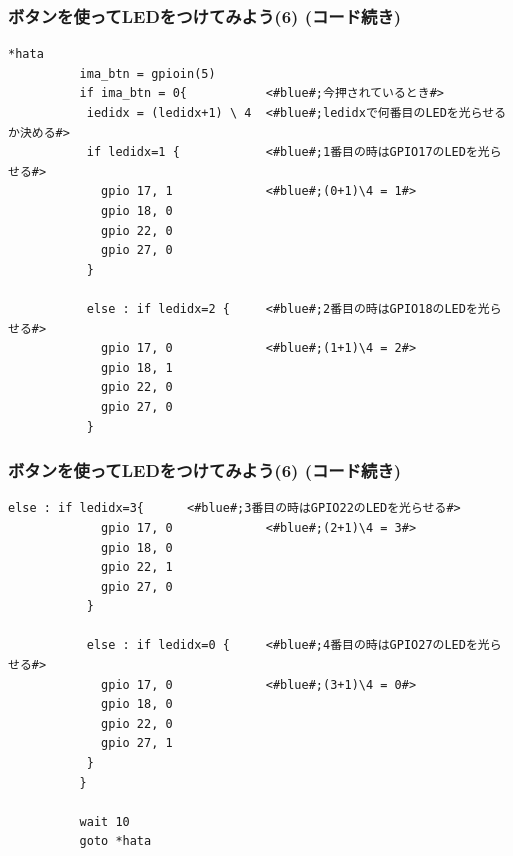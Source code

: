 \begin{frame}[fragile]
  \frametitle{ボタンを使ってLEDをつけてみよう(6) (コード続き)}
  \begin{lstlisting}[title=button\_led3.hsp, label=button_led3.hsp]
  *hata
          ima_btn = gpioin(5)
          if ima_btn = 0{           <#blue#;今押されているとき#>
           iedidx = (ledidx+1) \ 4  <#blue#;ledidxで何番目のLEDを光らせるか決める#>
           if ledidx=1 {            <#blue#;1番目の時はGPIO17のLEDを光らせる#>
             gpio 17, 1             <#blue#;(0+1)\4 = 1#>
             gpio 18, 0 
             gpio 22, 0
             gpio 27, 0
           }

           else : if ledidx=2 {     <#blue#;2番目の時はGPIO18のLEDを光らせる#>
             gpio 17, 0             <#blue#;(1+1)\4 = 2#>
             gpio 18, 1
             gpio 22, 0
             gpio 27, 0
           }
  \end{lstlisting}
\end{frame}

\begin{frame}[fragile]
  \frametitle{ボタンを使ってLEDをつけてみよう(6) (コード続き)}
  \begin{lstlisting}[title=button\_led3.hsp, label=button_led3.hsp]
           else : if ledidx=3{      <#blue#;3番目の時はGPIO22のLEDを光らせる#>
             gpio 17, 0             <#blue#;(2+1)\4 = 3#>
             gpio 18, 0
             gpio 22, 1
             gpio 27, 0
           }

           else : if ledidx=0 {     <#blue#;4番目の時はGPIO27のLEDを光らせる#>
             gpio 17, 0             <#blue#;(3+1)\4 = 0#>
             gpio 18, 0
             gpio 22, 0
             gpio 27, 1
           }
          }

          wait 10
          goto *hata
  \end{lstlisting}
\end{frame}

